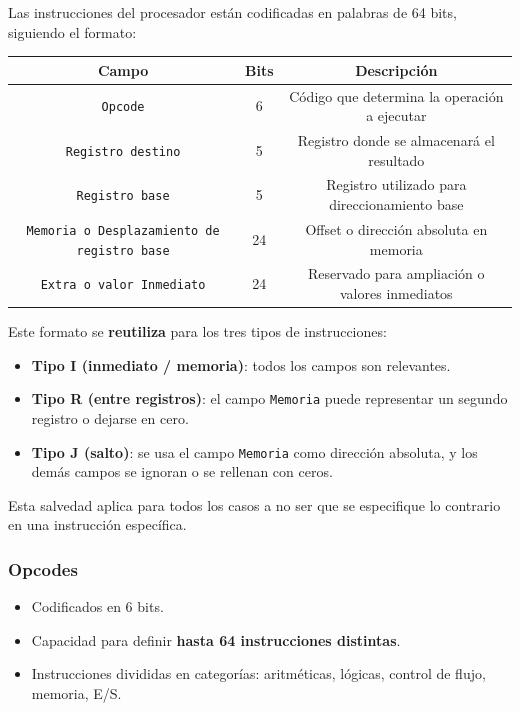 \documentclass{article}
\begin{document}
Las instrucciones del procesador están codificadas en palabras de 64 bits, siguiendo el formato:

\begin{table}[h!]
  \centering
  \begin{tabular}{|c|c|c|}
    \hline
    \textbf{Campo}                                     & \textbf{Bits} & \textbf{Descripción}                           \\
    \hline
    \texttt{Opcode}                                    & 6             & Código que determina la operación a ejecutar   \\
    \texttt{Registro destino}                          & 5             & Registro donde se almacenará el resultado      \\
    \texttt{Registro base}                             & 5             & Registro utilizado para direccionamiento base  \\
    \texttt{Memoria o Desplazamiento de registro base} & 24            & Offset o dirección absoluta en memoria         \\
    \texttt{Extra o valor Inmediato}                   & 24            & Reservado para ampliación o valores inmediatos \\
    \hline
  \end{tabular}
\end{table}

Este formato se \textbf{reutiliza} para los tres tipos de instrucciones:

\begin{itemize}
  \item \textbf{Tipo I (inmediato / memoria)}: todos los campos son relevantes.
  \item \textbf{Tipo R (entre registros)}: el campo \texttt{Memoria} puede representar un segundo registro o dejarse en cero.
  \item \textbf{Tipo J (salto)}: se usa el campo \texttt{Memoria} como dirección absoluta, y los demás campos se ignoran o se rellenan con ceros.
\end{itemize}

Esta salvedad aplica para todos los casos a no ser que se especifique lo contrario en una instrucción específica.

\subsubsection{Opcodes}

\begin{itemize}
  \item Codificados en 6 bits.
  \item Capacidad para definir \textbf{hasta 64 instrucciones distintas}.
  \item Instrucciones divididas en categorías: aritméticas, lógicas, control de flujo, memoria, E/S.
\end{itemize}
\end{document}
